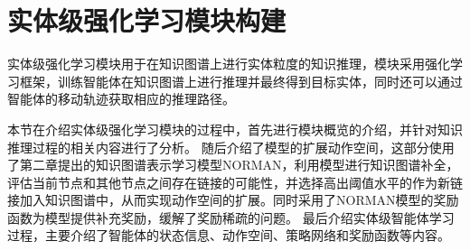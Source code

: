 \documentclass[algorithmlist, AutoFakeBold, AutoFakeSlant, figurelist, tablelist, nomlist, engineering]{seuthesix}
\begin{document}
\section{实体级强化学习模块构建}
实体级强化学习模块用于在知识图谱上进行实体粒度的知识推理，模块采用强化学习框架，训练智能体在知识图谱上进行推理并最终得到目标实体，同时还可以通过智能体的移动轨迹获取相应的推理路径。

本节在介绍实体级强化学习模块的过程中，首先进行模块概览的介绍，并针对知识推理过程的相关内容进行了分析。
随后介绍了模型的扩展动作空间，这部分使用了第二章提出的知识图谱表示学习模型NORMAN，利用模型进行知识图谱补全，评估当前节点和其他节点之间存在链接的可能性，并选择高出阈值水平的作为新链接加入知识图谱中，从而实现动作空间的扩展。同时采用了NORMAN模型的奖励函数为模型提供补充奖励，缓解了奖励稀疏的问题。
最后介绍实体级智能体学习过程，主要介绍了智能体的状态信息、动作空间、策略网络和奖励函数等内容。
\end{document}
